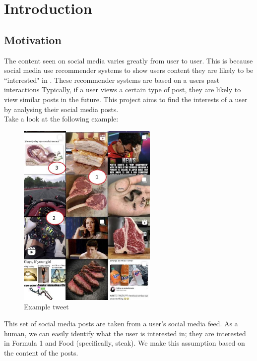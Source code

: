 \chapter{Introduction}
\label{ch:introduction}

\section{Motivation}

The content seen on social media varies greatly from user to user. This is because social media use recommender systems to
show users content they are likely to be ``interested" in \cite{}. These recommender systems are based on a users past interactions \cite{}
Typically, if a user views a certain type of post, they are likely to view similar posts in the future. This project aims
to find the interests of a user by analysing their social media posts.\\

Take a look at the following example:
\begin{figure}
    \centering
    \includegraphics[width=0.6\textwidth]{../images/tweet-example.png}
    \caption{Example tweet}
    \label{fig:motivation-example}
\end{figure}

This set of social media posts are taken from a user's social media feed. As a human, we can easily identify what the user is
interested in; they are interested in Formula 1 and Food (specifically, steak). We make this assumption based on the content
of the posts.\\

